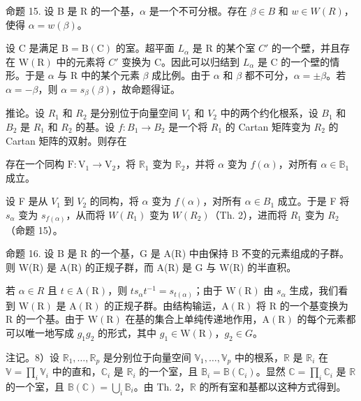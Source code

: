 命题 15. 设 B 是 R 的一个基，\(\alpha\) 是一个不可分根。存在 \(\beta \in B\) 和 \(w \in W(R)\)，使得 \(\alpha = w(\beta)\)。

设 C 是满足 \(\mathrm{B} = \mathrm{B}(\mathrm{C})\) 的室。超平面 \(L_{\alpha}\) 是 R 的某个室 \(C'\) 的一个壁，并且存在 \(\mathrm{W}(\mathrm{R})\) 中的元素将 \(C'\) 变换为 C。因此可以归结到 \(L_{\alpha}\) 是 C 的一个壁的情形。于是 \(\alpha\) 与 R 中的某个元素 \(\beta\) 成比例。由于 \(\alpha\) 和 \(\beta\) 都不可分，\(\alpha = \pm\beta\)。若 \(\alpha = -\beta\)，则 \(\alpha = s_{\beta}(\beta)\)，故命题得证。

推论。设 \(R_{1}\) 和 \(R_{2}\) 是分别位于向量空间 \(V_{1}\) 和 \(V_{2}\) 中的两个约化根系，设 \(B_{1}\) 和 \(B_{2}\) 是 \(R_{1}\) 和 \(R_{2}\) 的基。设 \(f: B_{1} \to B_{2}\) 是一个将 \(R_{1}\) 的 Cartan 矩阵变为 \(R_{2}\) 的 Cartan 矩阵的双射。则存在

存在一个同构 \(\mathrm{F}: \mathrm{V}_1 \to \mathrm{V}_2\)，将 \(\mathbb{R}_1\) 变为 \(\mathbb{R}_2\)，并将 \(\alpha\) 变为 \(f(\alpha)\)，对所有 \(\alpha \in \mathbb{B}_1\) 成立。

设 F 是从 \(V_{1}\) 到 \(V_{2}\) 的同构，将 \(\alpha\) 变为 \(f(\alpha)\)，对所有 \(\alpha \in B_{1}\) 成立。于是 F 将 \(s_{\alpha}\) 变为 \(s_{f(\alpha)}\)，从而将 \(W(R_{1})\) 变为 \(W(R_{2})\)（Th. 2），进而将 \(R_{1}\) 变为 \(R_{2}\)（命题 15）。

命题 16. 设 B 是 R 的一个基，G 是 A(R) 中由保持 B 不变的元素组成的子群。则 W(R) 是 A(R) 的正规子群，而 A(R) 是 G 与 W(R) 的半直积。

若 \(\alpha\in R\) 且 \(t\in\mathrm{A}(\mathrm{R})\)，则 \(ts_{\alpha}t^{-1}=s_{t(\alpha)}\)；由于 \(\mathrm{W}(\mathrm{R})\) 由 \(s_{\alpha}\) 生成，我们看到 \(\mathrm{W}(\mathrm{R})\) 是 \(\mathrm{A}(\mathrm{R})\) 的正规子群。由结构输运，\(\mathrm{A}(\mathrm{R})\) 将 R 的一个基变换为 R 的一个基。由于 \(\mathrm{W}(\mathrm{R})\) 在基的集合上单纯传递地作用，\(\mathrm{A}(\mathrm{R})\) 的每个元素都可以唯一地写成 \(g_{1}g_{2}\) 的形式，其中 \(g_{1}\in\mathrm{W}(\mathrm{R})\)，\(g_{2}\in G\)。

注记。8）设 \(\mathbb{R}_1, \ldots, \mathbb{R}_p\) 是分别位于向量空间 \(\mathbb{V}_1, \ldots, \mathbb{V}_p\) 中的根系，\(\mathbb{R}\) 是 \(\mathbb{R}_i\) 在 \(\mathbb{V} = \prod_i \mathbb{V}_i\) 中的直和，\(\mathbb{C}_i\) 是 \(\mathbb{R}_i\) 的一个室，且 \(\mathbb{B}_i = \mathbb{B}(\mathbb{C}_i)\)。显然 \(\mathbb{C} = \prod_i \mathbb{C}_i\) 是 \(\mathbb{R}\) 的一个室，且 \(\mathbb{B}(\mathbb{C}) = \bigcup_i \mathbb{B}_i\)。由 Th. 2，\(\mathbb{R}\) 的所有室和基都以这种方式得到。


